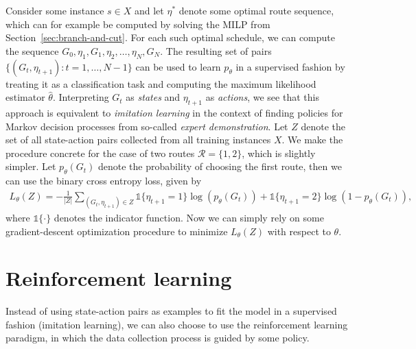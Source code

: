 \documentclass[a4paper]{report}
\theoremstyle{definition}
\theoremstyle{plain}
\begin{document}
Consider some instance $s \in X$ and let $\eta^{*}$ denote some optimal route
sequence, which can for example be computed by solving the MILP from
Section~\ref{sec:branch-and-cut}. For each such optimal schedule, we can compute
the sequence $G_{0}, \eta_{1}, G_{1}, \eta_{2}, \dots, \eta_{N}, G_{N}$. The
resulting set of pairs $\{ (G_{t}, \eta_{t+1}) : t = 1, \dots, N - 1 \}$ can be used to
learn $p_{\theta}$ in a supervised fashion by treating it as a classification task
and computing the maximum likelihood estimator $\hat{\theta}$. Interpreting $G_{t}$
as \textit{states} and $\eta_{t+1}$ as \textit{actions}, we see that this
approach is equivalent to \textit{imitation learning} in the context of finding
policies for Markov decision processes from so-called \textit{expert
  demonstration}.
%
Let $Z$ denote the set of all state-action pairs collected from all
training instances $X$. We make the procedure concrete for the case of two
routes $\mathcal{R} = \{ 1, 2 \}$, which is slightly simpler. Let $p_{\theta}(G_{t})$
denote the probability of choosing the first route, then we can use the binary
cross entropy loss, given by
\begin{align*}
  L_{\theta}(Z) = - \frac{1}{|Z|} \sum_{(G_{t}, \eta_{t+1}) \in Z} \mathds{1}\{\eta_{t+1} = 1\} \log(p_{\theta}(G_{t})) + \mathds{1}\{\eta_{t+1} = 2\} \log(1 - p_{\theta}(G_{t})) ,
\end{align*}
where $\mathds{1}\{\cdot\}$ denotes the indicator function. Now we can simply rely on
some gradient-descent optimization procedure to minimize $L_{\theta}(Z)$ with
respect to $\theta$.

\section{Reinforcement learning}

Instead of using state-action pairs as examples to fit the model in a supervised
fashion (imitation learning), we can also choose to use the reinforcement
learning paradigm, in which the data collection process is guided by some
policy.
\end{document}

